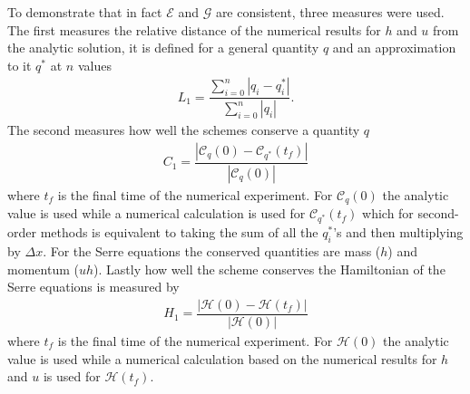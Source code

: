 \documentclass[SingleSpace,12pt,Journal]{Serre_ASCE}
\begin{document}
To demonstrate that in fact $\mathcal{E}$ and $\mathcal{G}$ are consistent, three measures were used. The first measures the relative distance of the numerical results for $h$ and $u$ from the analytic solution, it is defined for a general quantity $q$ and an approximation to it $q^*$ at $n$ values
\begin{gather}
L_1 = \dfrac{\sum_{i = 0}^{n} \left| q_i - q^*_i\right|}{\sum_{i = 0}^{n} \left| q_i\right|}.
\end{gather}
The second measures how well the schemes conserve a quantity $q$
\begin{gather}
C_1 = \dfrac{\left| \mathcal{C}_q(0) - \mathcal{C}_{q^*}(t_f) \right|}{\left| \mathcal{C}_q(0) \right|}
\end{gather}
where $t_f$ is the final time of the numerical experiment. For $\mathcal{C}_q(0)$ the analytic value is used while a numerical calculation is used for $\mathcal{C}_{q^*}(t_f)$ which for second-order methods is equivalent to taking the sum of all the $q^*_i$'s and then multiplying by $\Delta x$. For the Serre equations the conserved quantities are mass ($h$) and momentum ($uh$). Lastly how well the scheme conserves the Hamiltonian of the Serre equations is measured by 
\begin{gather}
H_1 = \dfrac{\left| \mathcal{H}(0) - \mathcal{H}(t_f) \right|}{\left| \mathcal{H}(0) \right|}
\end{gather}
where $t_f$ is the final time of the numerical experiment. For $\mathcal{H}(0)$ the analytic value is used while a numerical calculation based on the numerical results for $h$ and $u$ is used for $\mathcal{H}(t_f)$.
%
\end{document}
